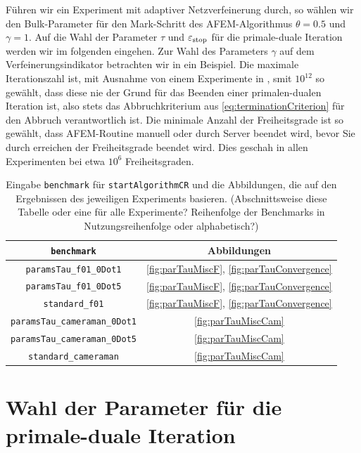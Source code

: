 Führen wir ein Experiment mit adaptiver Netzverfeinerung durch, so wählen wir
den Bulk-Parameter für den Mark-Schritt des AFEM-Algorithmus $\theta=0.5$ und
$\gamma=1$.
Auf die Wahl der Parameter $\tau$ und $\varepsilon_{\textup{stop}}$ für die primale-duale
Iteration werden wir im folgenden  eingehen.
Zur Wahl des Parameters $\gamma$ auf dem Verfeinerungsindikator betrachten
wir in  ein Beispiel.
Die maximale Iterationszahl ist, mit Ausnahme von einem Experimente in
, smit $10^{12}$ so gewählt, dass diese nie 
der Grund für das Beenden einer primalen-dualen Iteration ist, also stets das
Abbruchkriterium aus \eqref{eq:terminationCriterion} für den Abbruch
verantwortlich ist.
Die minimale Anzahl der Freiheitsgrade ist so gewählt, dass AFEM-Routine
manuell oder durch Server beendet wird, bevor Sie durch erreichen 
der Freiheitsgrade beendet wird. Dies geschah in allen Experimenten bei 
etwa $10^6$ Freiheitsgraden.

\begin{table}
  \centering
  \begin{tabular}{c|c}
    \hline
    \texttt{benchmark} & Abbildungen\\  
    \hline 
    \texttt{paramsTau\_f01\_0Dot1} &
    \ref{fig:parTauMiscF}, \ref{fig:parTauConvergence}\\
    \texttt{paramsTau\_f01\_0Dot5} &
    \ref{fig:parTauMiscF}, \ref{fig:parTauConvergence}\\
    \texttt{standard\_f01} &
    \ref{fig:parTauMiscF}, \ref{fig:parTauConvergence}\\
    \texttt{paramsTau\_cameraman\_0Dot1} &
    \ref{fig:parTauMiscCam}\\
    \texttt{paramsTau\_cameraman\_0Dot5} &
    \ref{fig:parTauMiscCam} \\
    \texttt{standard\_cameraman} &
    \ref{fig:parTauMiscCam}\\
    \hline
  \end{tabular}
  \caption{Eingabe \texttt{benchmark} für \texttt{startAlgorithmCR} und die
  Abbildungen, die auf den Ergebnissen des jeweiligen Experiments basieren. 
  (Abschnittsweise diese Tabelle oder eine für alle Experimente? Reihenfolge
  der Benchmarks in Nutzungsreihenfolge oder alphabetisch?)}
  \label{tab:usedBenchmarks}
\end{table} 


\section{Wahl der Parameter für die primale-duale Iteration}
\label{sec:choiceOfParameters}

